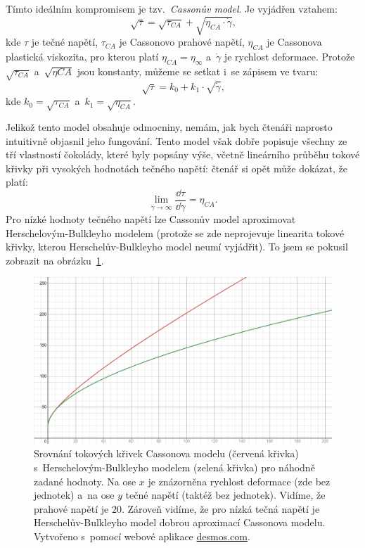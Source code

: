 \documentclass[12pt]{article}
\begin{document}
Tímto ideálním kompromisem je tzv.~\emph{Cassonův model}. Je vyjádřen vztahem:~\cite{Article:Comparison_of_models_chocolate}\cite{Article:Determination_of_chocolate_viscosity}\cite{Article:Extended_casson_equation}\cite{Article:Flow_properties_molten_chocolate}
\begin{equation}
    \sqrt{\tau} = \sqrt{\tau_{CA}} + \sqrt{\eta_{CA}\cdot\dot\gamma}\text{,}
    \label{eq:Casson_model}
\end{equation}
kde $\tau$ je tečné napětí, $\tau_{CA}$ je Cassonovo prahové napětí, $\eta_{CA}$ je Cassonova plastická viskozita, pro kterou platí $\eta_{CA} = \eta_\infty$ a~$\dot\gamma$ je rychlost deformace. Protože $\sqrt{\tau_{CA}}$ a~$\sqrt{\eta{CA}}$ jsou konstanty, můžeme se setkat i~se zápisem ve tvaru:~\cite{Article:Rapid_and_economic_chocolate_viscosity}
\begin{equation}
    \sqrt{\tau} = k_0 + k_1\cdot\sqrt{\dot\gamma}\text{,}
\end{equation}
kde $k_0 = \sqrt{\tau_{CA}}$ a~$k_1 = \sqrt{\eta_{CA}}$.
\par\noindent
Jelikož tento model obsahuje odmocniny, nemám, jak bych čtenáři naprosto intuitivně objasnil jeho fungování. Tento model však dobře popisuje všechny ze tří vlastností čokolády, které byly popsány výše, včetně lineárního průběhu tokové křivky při vysokých hodnotách tečného napětí: čtenář si opět může dokázat, že platí:
\begin{equation}
    \lim_{\dot\gamma\to\infty} \frac{\dd\tau}{\dd\dot\gamma} = \eta_{CA}\text{.}
\end{equation}
Pro nízké hodnoty tečného napětí lze Cassonův model aproximovat Herschelovým-Bulkleyho modelem (protože se zde neprojevuje linearita tokové křivky, kterou Herschelův-Bulkleyho model neumí vyjádřit). To jsem se pokusil zobrazit na obrázku~\ref{fig:Casson_vs_Herschel}.
\begin{figure}
    \centering
    \includegraphics[width=\linewidth]{figures/Casson vs Herschel.png}
    \caption{Srovnání tokových křivek Cassonova modelu (červená křivka) s~Herschelovým-Bulkleyho modelem (zelená křivka) pro náhodně zadané hodnoty. Na ose $x$ je znázorněna rychlost deformace (zde bez jednotek) a~na ose $y$ tečné napětí (taktéž bez jednotek). Vidíme, že prahové napětí je $20$. Zároveň vidíme, že pro nízká tečná napětí je Herschelův-Bulkleyho model dobrou aproximací Cassonova modelu. Vytvořeno s~pomocí webové aplikace \url{desmos.com}.}
    \label{fig:Casson_vs_Herschel}
\end{figure}
\end{document}
